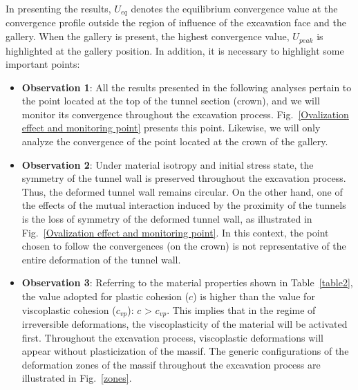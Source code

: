 \documentclass[a4paper,fleqn]{cas-sc}
\begin{document}
\FloatBarrier
In presenting the results, $U_{eq}$ denotes the equilibrium convergence value at the convergence profile outside the region of influence of the excavation face and the gallery. When the gallery is present, the highest convergence value, $U_{peak}$ is highlighted at the gallery position. In addition, it is necessary to highlight some important points:
\begin{itemize}[]
	\item \textbf{Observation 1}: All the results presented in the following analyses pertain to the point located at the top of the tunnel section (crown), and we will monitor its convergence throughout the excavation process. Fig.~\ref{Ovalization effect and monitoring point} presents this point. Likewise, we will only analyze the convergence of the point located at the crown of the gallery. 
	\item \textbf{Observation 2}: Under material isotropy and initial stress state, the symmetry of the tunnel wall is preserved throughout the excavation process. Thus, the deformed tunnel wall remains circular. On the other hand, one of the effects of the mutual interaction induced by the proximity of the tunnels is the loss of symmetry of the deformed tunnel wall, as illustrated in Fig.~\ref{Ovalization effect and monitoring point}. In this context, the point chosen to follow the convergences (on the crown) is not representative of the entire deformation of the tunnel wall. 
	\item \textbf{Observation 3}: Referring to the material properties shown in Table~\ref{table2}, the value adopted for plastic cohesion ($c$) is higher than the value for viscoplastic cohesion ($c_{vp}$): $c$ > $c_{vp}$. This implies that in the regime of irreversible deformations, the viscoplasticity of the material will be activated first. Throughout the excavation process, viscoplastic deformations will appear without plasticization of the massif. The generic configurations of the deformation zones of the massif throughout the excavation process are illustrated in Fig.~\ref{zones}.
\end{itemize}
\end{document}
